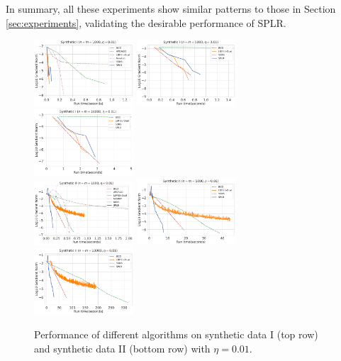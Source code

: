 \documentclass{article}
\theoremstyle{plain}
\theoremstyle{definition}
\theoremstyle{remark}
\begin{document}
In summary, all these experiments show similar patterns to those in Section \ref{sec:experiments}, validating the desirable performance of SPLR.

\begin{figure}[p]
    \centering
    \includegraphics[width=0.33\textwidth]{save/Synthetic I - Extra/run_times/n=1000, m=1000, reg=0.01}
    \includegraphics[width=0.33\textwidth]{save/Synthetic I - Extra/run_times/n=5000, m=5000, reg=0.01}
    \includegraphics[width=0.33\textwidth]{save/Synthetic I - Extra/run_times/n=10000, m=10000, reg=0.01}\\
    \includegraphics[width=0.33\textwidth]{save/Synthetic II - Extra/run_times/n=1000, m=1000, reg=0.01}
    \includegraphics[width=0.33\textwidth]{save/Synthetic II - Extra/run_times/n=5000, m=5000, reg=0.01}
    \includegraphics[width=0.33\textwidth]{save/Synthetic II - Extra/run_times/n=10000, m=10000, reg=0.01}
    \caption{Performance of different algorithms on synthetic data I (top row) and synthetic data II (bottom row) with $\eta=0.01$.}
    \label{fig:synthetic_eta_0.01}
\end{figure}
\end{document}
